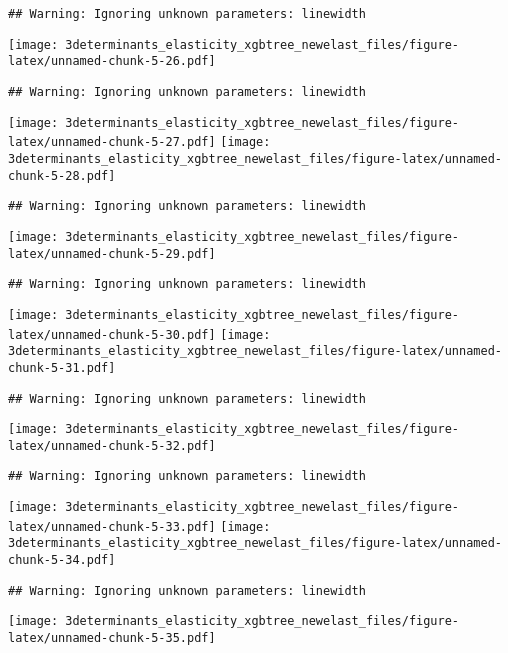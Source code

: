 \documentclass[
]{article}
\begin{document}
\begin{verbatim}
## Warning: Ignoring unknown parameters: linewidth
\end{verbatim}

\texttt{[image: 3determinants\_elasticity\_xgbtree\_newelast\_files/figure-latex/unnamed-chunk-5-26.pdf]}

\begin{verbatim}
## Warning: Ignoring unknown parameters: linewidth
\end{verbatim}

\texttt{[image: 3determinants\_elasticity\_xgbtree\_newelast\_files/figure-latex/unnamed-chunk-5-27.pdf]}
\texttt{[image: 3determinants\_elasticity\_xgbtree\_newelast\_files/figure-latex/unnamed-chunk-5-28.pdf]}

\begin{verbatim}
## Warning: Ignoring unknown parameters: linewidth
\end{verbatim}

\texttt{[image: 3determinants\_elasticity\_xgbtree\_newelast\_files/figure-latex/unnamed-chunk-5-29.pdf]}

\begin{verbatim}
## Warning: Ignoring unknown parameters: linewidth
\end{verbatim}

\texttt{[image: 3determinants\_elasticity\_xgbtree\_newelast\_files/figure-latex/unnamed-chunk-5-30.pdf]}
\texttt{[image: 3determinants\_elasticity\_xgbtree\_newelast\_files/figure-latex/unnamed-chunk-5-31.pdf]}

\begin{verbatim}
## Warning: Ignoring unknown parameters: linewidth
\end{verbatim}

\texttt{[image: 3determinants\_elasticity\_xgbtree\_newelast\_files/figure-latex/unnamed-chunk-5-32.pdf]}

\begin{verbatim}
## Warning: Ignoring unknown parameters: linewidth
\end{verbatim}

\texttt{[image: 3determinants\_elasticity\_xgbtree\_newelast\_files/figure-latex/unnamed-chunk-5-33.pdf]}
\texttt{[image: 3determinants\_elasticity\_xgbtree\_newelast\_files/figure-latex/unnamed-chunk-5-34.pdf]}

\begin{verbatim}
## Warning: Ignoring unknown parameters: linewidth
\end{verbatim}

\texttt{[image: 3determinants\_elasticity\_xgbtree\_newelast\_files/figure-latex/unnamed-chunk-5-35.pdf]}
\end{document}

